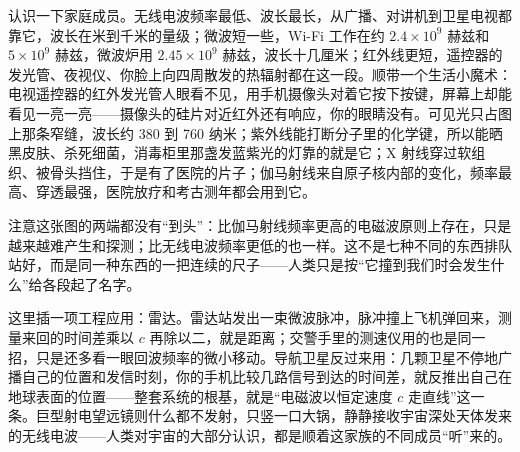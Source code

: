 \begin{center}
\end{center}

\begin{mainline}
认识一下家庭成员。无线电波频率最低、波长最长，从广播、对讲机到卫星电视都靠它，波长在米到千米的量级；微波短一些，Wi-Fi 工作在约 $2.4\times10^{9}$ 赫兹和 $5\times10^{9}$ 赫兹，微波炉用 $2.45\times10^{9}$ 赫兹，波长十几厘米；红外线更短，遥控器的发光管、夜视仪、你脸上向四周散发的热辐射都在这一段。顺带一个生活小魔术：电视遥控器的红外发光管人眼看不见，用手机摄像头对着它按下按键，屏幕上却能看见一亮一亮——摄像头的硅片对近红外还有响应，你的眼睛没有。可见光只占图上那条窄缝，波长约 380 到 760 纳米；紫外线能打断分子里的化学键，所以能晒黑皮肤、杀死细菌，消毒柜里那盏发蓝紫光的灯靠的就是它；X 射线穿过软组织、被骨头挡住，于是有了医院的片子；伽马射线来自原子核内部的变化，频率最高、穿透最强，医院放疗和考古测年都会用到它。

注意这张图的两端都没有“到头”：比伽马射线频率更高的电磁波原则上存在，只是越来越难产生和探测；比无线电波频率更低的也一样。这不是七种不同的东西排队站好，而是同一种东西的一把连续的尺子——人类只是按“它撞到我们时会发生什么”给各段起了名字。

这里插一项工程应用：雷达。雷达站发出一束微波脉冲，脉冲撞上飞机弹回来，测量来回的时间差乘以 $c$ 再除以二，就是距离；交警手里的测速仪用的也是同一招，只是还多看一眼回波频率的微小移动。导航卫星反过来用：几颗卫星不停地广播自己的位置和发信时刻，你的手机比较几路信号到达的时间差，就反推出自己在地球表面的位置——整套系统的根基，就是“电磁波以恒定速度 $c$ 走直线”这一条。巨型射电望远镜则什么都不发射，只竖一口大锅，静静接收宇宙深处天体发来的无线电波——人类对宇宙的大部分认识，都是顺着这家族的不同成员“听”来的。
\end{mainline}

